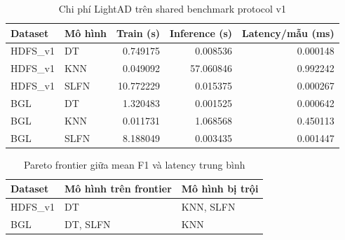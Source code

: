 

\begin{table}[ht]
\centering
\caption{Chi phí LightAD trên shared benchmark protocol v1}
\label{tab:rq2_lightad}
\begin{tabular}{llrrr}
\toprule
Dataset & Mô hình & Train (s) & Inference (s) & Latency/mẫu (ms) \\
\midrule
HDFS\_v1 & DT & 0.749175 & 0.008536 & 0.000148 \\
HDFS\_v1 & KNN & 0.049092 & 57.060846 & 0.992242 \\
HDFS\_v1 & SLFN & 10.772229 & 0.015375 & 0.000267 \\
BGL & DT & 1.320483 & 0.001525 & 0.000642 \\
BGL & KNN & 0.011731 & 1.068568 & 0.450113 \\
BGL & SLFN & 8.188049 & 0.003435 & 0.001447 \\
\bottomrule
\end{tabular}
\end{table}

\begin{table}[ht]
\centering
\caption{Pareto frontier giữa mean F1 và latency trung bình}
\label{tab:rq3_lightad}
\begin{tabular}{lll}
\toprule
Dataset & Mô hình trên frontier & Mô hình bị trội \\
\midrule
HDFS\_v1 & DT & KNN, SLFN \\
BGL & DT, SLFN & KNN \\
\bottomrule
\end{tabular}
\end{table}
